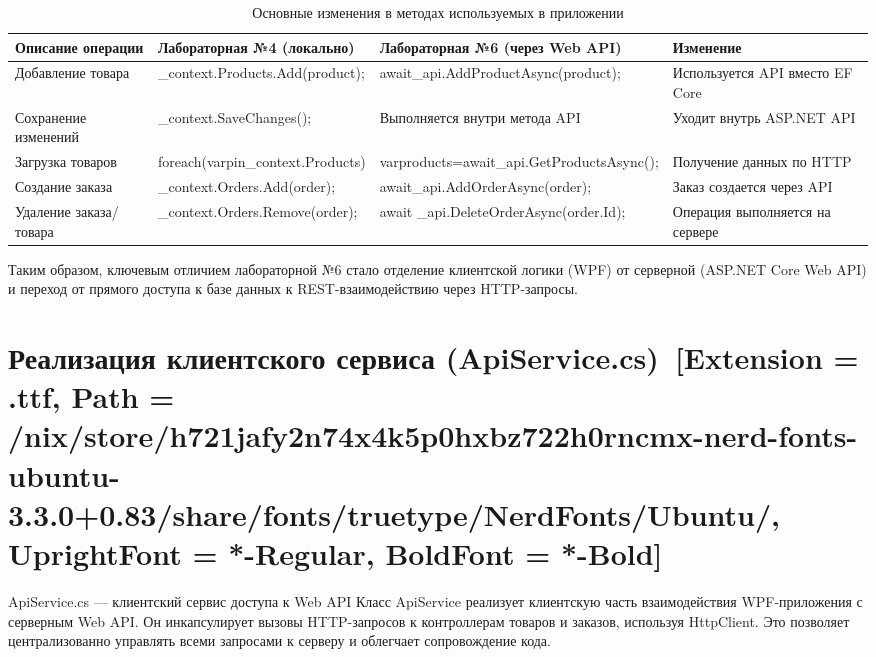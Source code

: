 \documentclass[12pt]{article}
\newcommand{\icon}[1]{\fontspec{UbuntuNerdFont}[Extension = .ttf,
  Path = /nix/store/h721jafy2n74x4k5p0hxbz722h0rncmx-nerd-fonts-ubuntu-3.3.0+0.83/share/fonts/truetype/NerdFonts/Ubuntu/,
  UprightFont = *-Regular,
BoldFont = *-Bold] #1}
\newcommand{\iicon}[1]{{\icon{#1}}}
\renewcommand{\texttt}[1]{{\small\ttfamily #1}}
\numberwithin{listing}{section}
\numberwithin{figure}{section}
\begin{document}
\renewcommand{\texttt}[1]{{\footnotesize\ttfamily #1}}
\begin{table}[H]
	\centering
	\footnotesize
	\begin{tabularx}{\linewidth}{X|>{\centering\arraybackslash}X|>{\centering\arraybackslash}X|>{\centering\arraybackslash}X}
		\toprule
		\textbf{Описание операции} & \textbf{Лабораторная №4 (локально)}             & \textbf{Лабораторная №6 (через Web API)}                    & \textbf{Изменение}              \\
		\midrule
		Добавление товара          & \texttt{\_con\-text.\-Products.Add\-(product);} & \texttt{await\_api.Add\-Product\-Async\-(product);}         & Используется API вместо EF Core \\
		Сохранение изменений       & \texttt{\_context.SaveChanges();}               & Выполняется внутри метода API                               & Уходит внутрь ASP.NET API       \\
		Загрузка товаров           & \texttt{foreach(varpin\_con\-text.\-Products)}  & \texttt{varproducts=await\_\-api.\-Get\-Products\-Async();} & Получение данных по HTTP        \\
		Создание заказа            & \texttt{\_context.Orders.Add\-(order);}         & \texttt{await\_api.AddOrder\-Async\-(order);}               & Заказ создается через API       \\
		Удаление заказа/товара     & \texttt{\_context.Orders.Remove\-(order);}      & \texttt{await \_api.DeleteOrder\-Async\-(order.Id);}        & Операция выполняется на сервере \\
		\bottomrule
	\end{tabularx}
	\caption{Основные изменения в методах используемых в приложении}
\end{table}

\renewcommand{\texttt}[1]{{\small\ttfamily #1}}

\noindent Таким образом, ключевым отличием лабораторной №6 стало отделение клиентской логики (WPF) от серверной (ASP.NET Core Web API) и переход от прямого доступа к базе данных к REST-взаимодействию через HTTP-запросы.

\newpage

\section{Реализация клиентского сервиса (\texttt{ApiService.cs})~\texorpdfstring{\iicon{}}{}}
\texttt{ApiService.cs} — клиентский сервис доступа к Web API Класс \texttt{ApiService} реализует клиентскую часть взаимодействия WPF-приложения с серверным Web API. Он инкапсулирует вызовы HTTP-запросов к контроллерам товаров и заказов, используя \texttt{HttpClient}. Это позволяет централизованно управлять всеми запросами к серверу и облегчает сопровождение кода.
\end{document}
